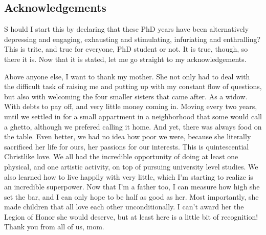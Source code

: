 
{}

\vspace*{-1.6cm}
\begin{flushright}
\section*{\fontsize{20pt}{20pt}\selectfont\textnormal{Acknowledgements}}
\end{flushright}
\vspace{-0.2cm}


\chead[\fancyplain{}{}]
      {\fancyplain{}{}}
\lfoot[\fancyplain{}{}]
      {\fancyplain{}{}}
\cfoot[\fancyplain{}{\thepage}]
      {\fancyplain{}{\thepage}}
\rfoot[\fancyplain{}{}]%
     {\fancyplain{}{\scriptsize}}


\lettrine[lines=1]{S}{ } hould I start this by declaring that these PhD years have been alternatively depressing and engaging, exhausting and stimulating, infuriating and enthralling? This is trite, and true for everyone, PhD student or not. It is true, though, so there it is. Now that it is stated, let me go straight to my acknowledgements.

Above anyone else, I want to thank my mother. She not only had to deal with the difficult task of raising me and putting up with my constant flow of questions, but also with welcoming the four smaller sisters that came after. As a widow. With debts to pay off, and very little money coming in. Moving every two years, until we settled in for a small appartment in a neighborhood that some would call a ghetto, although we prefered calling it home. And yet, there was always food on the table. Even better, we had no idea how poor we were, because she literally sacrificed her life for ours, her passions for our interests. This is quintescential Christlike love. We all had the incredible opportunity of doing at least one physical, and one artistic activity, on top of pursuing university level studies. We also learned how to live happily with very little, which I'm starting to realize is an incredible superpower. Now that I'm a father too, I can measure how high she set the bar, and I can only hope to be half as good as her. Most importantly, she made children that all love each other unconditionally. I can't award her the Legion of Honor she would deserve, but at least here is a little bit of recognition! Thank you from all of us, mom.

